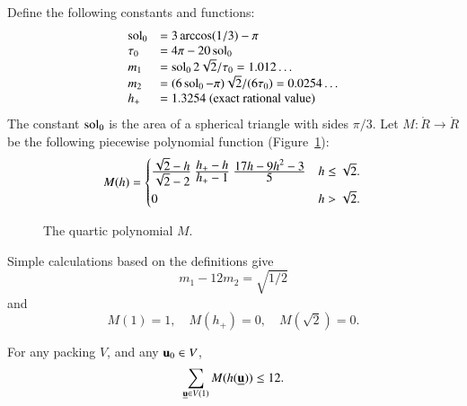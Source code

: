 
Define the following constants and functions: 
\begin{equation}\label{eqn:m-def}
\begin{array}{lll}
\sol_0 &= 3\arccos(1/3)-\pi\\
\tau_0 &= 4\pi  - 20\sol_0\\
m_1 &= \sol_0 2\sqrt2/\tau_0 = 1.012\ldots \\ %
m_2  &=  (6\sol_0- \pi)\sqrt2/(6 \tau_0) = 0.0254\ldots\\ %
h_+ &= 1.3254 \hbox{~(exact rational value)}
\end{array}
\end{equation}
The constant $\operatorname{sol}_0$
is the area of a spherical triangle with sides $\pi/3$.
Let $M:\ring{R}\to\ring{R}$ 
be the following piecewise polynomial function (Figure~\ref{fig:M}):
\begin{equation}\label{eqn:M}
M(h) =
\begin{cases}
\dfrac{\sqrt2-h}{\sqrt2-2}~ \dfrac{h_+-h}{h_+-1} ~\dfrac{17 h - 9 h^2 - 3}{5} & h \le \sqrt2.\vspace{3pt} \\
 0 & h >\sqrt2.
\end{cases}
\\
\end{equation}
\begin{figure}[htb]
  \centering
  \caption{The quartic polynomial $M$.}
  \label{fig:M}
\end{figure}

Simple calculations based on the definitions give
\begin{equation}\label{eqn:km}m_1 - 12m_2 = \sqrt{1/2}\end{equation}
and
\begin{equation}M(1) = 1,\quad M(h_+)=0,\quad M(\sqrt2) =0.\end{equation}


\begin{conjecture}[Marchal]\label{conj:m1} For any packing $ V$, and
any $ {\mathbf u}_0\in V$, 
\begin{displaymath}
\sum_{{\underline{{\mathbf u}}}\in V(1)} M(h({\underline{{\mathbf u}}})) \le 12.
\end{displaymath}
\end{conjecture}

